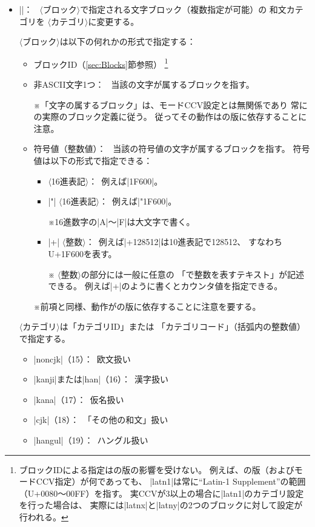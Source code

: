 \documentclass[uplatex,dvipdfmx,a4paper]{jsarticle}
\newcommand{\Meta}[1]{%
  $\langle$\mbox{}\nolinebreak#1\nolinebreak\mbox{}$\rangle$}
\newcommand{\Note}{\par\noindent ※}
\newcommand{\Means}{：~}
\begin{document}
\begin{itemize}
\item |\cjkcategory{|\Meta{ブロック}|,...}{|\Meta{カテゴリ}|}|\Means
  \Meta{ブロック}で指定される文字ブロック（複数指定が可能）の
  和文カテゴリを\Meta{カテゴリ}に変更する。

  \Meta{ブロック}は以下の何れかの形式で指定する：
  \begin{itemize}
  \item ブロックID（\ref{sec:Blocks}節参照）%
    \footnote{ブロックIDによる指定は{\upTeX}の版の影響を受けない。
      例えば、{\upTeX}の版（およびモードCCV指定）が何であっても、
      |latn1|は常に“Latin-1 Supplement”の範囲（U+0080～00FF）を指す。
      実CCVが3以上の場合に|latn1|のカテゴリ設定を行った場合は、
      実際には|latnx|と|latny|の2つのブロックに対して設定が行われる。}
  \item 非ASCII文字1つ\Means
    当該の文字が属するブロックを指す。
    \Note 「文字の属するブロック」は、モードCCV設定とは無関係であり
    常に{\upTeX}の実際のブロック定義に従う。
    従ってその動作は{\upTeX}の版に依存することに注意。
  \item 符号値（整数値）\Means
    当該の符号値の文字が属するブロックを指す。
    符号値は以下の形式で指定できる\Means
    \begin{itemize}
    \item \Meta{16進表記}\Means 例えば|1F600|。
    \item |"|\Meta{16進表記}\Means 例えば|"1F600|。
      \Note 16進数字の|A|～|F|は大文字で書く。
    \item |+|\Meta{整数}\Means 例えば|+128512|は10進表記で128512、
      すなわちU+1F600を表す。
      \Note \Meta{整数}の部分には一般に任意の
      「{\LaTeXTeX}で整数を表すテキスト」が記述できる。
      例えば|+\value{mycode}|のように書くとカウンタ値を指定できる。
    \end{itemize}
    \Note 前項と同様、動作が{\upTeX}の版に依存することに注意を要する。
  \end{itemize}
  \Meta{カテゴリ}は「カテゴリID」または
  「カテゴリコード」（括弧内の整数値）で指定する。
  \begin{itemize}
  \item |noncjk|（15）\Means 欧文扱い
  \item |kanji|または|han|（16）\Means 漢字扱い
  \item |kana|（17）\Means 仮名扱い
  \item |cjk|（18）\Means \<「その他の和文」扱い
  \item |hangul|（19）\Means ハングル扱い
  \end{itemize}


\end{itemize}
\end{document}
